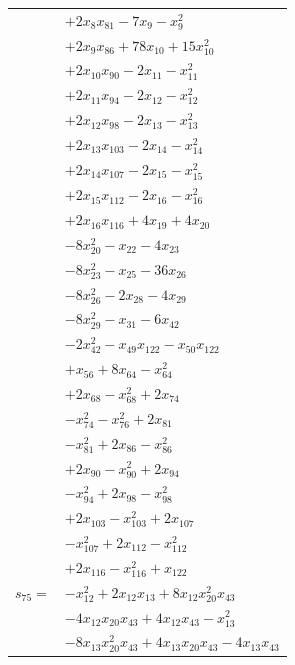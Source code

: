 \begin{longtable}{@{}r@{\;}l@{}}
 & \(\displaystyle +2x_{8}x_{81} -7x_{9} -x_{9}^{2}\) \\
 & \(\displaystyle +2x_{9}x_{86} +78x_{10} +15x_{10}^{2}\) \\
 & \(\displaystyle +2x_{10}x_{90} -2x_{11} -x_{11}^{2}\) \\
 & \(\displaystyle +2x_{11}x_{94} -2x_{12} -x_{12}^{2}\) \\
 & \(\displaystyle +2x_{12}x_{98} -2x_{13} -x_{13}^{2}\) \\
 & \(\displaystyle +2x_{13}x_{103} -2x_{14} -x_{14}^{2}\) \\
 & \(\displaystyle +2x_{14}x_{107} -2x_{15} -x_{15}^{2}\) \\
 & \(\displaystyle +2x_{15}x_{112} -2x_{16} -x_{16}^{2}\) \\
 & \(\displaystyle +2x_{16}x_{116} +4x_{19} +4x_{20}\) \\
 & \(\displaystyle -8x_{20}^{2} -x_{22} -4x_{23}\) \\
 & \(\displaystyle -8x_{23}^{2} -x_{25} -36x_{26}\) \\
 & \(\displaystyle -8x_{26}^{2} -2x_{28} -4x_{29}\) \\
 & \(\displaystyle -8x_{29}^{2} -x_{31} -6x_{42}\) \\
 & \(\displaystyle -2x_{42}^{2} -x_{49}x_{122} -x_{50}x_{122}\) \\
 & \(\displaystyle +x_{56} +8x_{64} -x_{64}^{2}\) \\
 & \(\displaystyle +2x_{68} -x_{68}^{2} +2x_{74}\) \\
 & \(\displaystyle -x_{74}^{2} -x_{76}^{2} +2x_{81}\) \\
 & \(\displaystyle -x_{81}^{2} +2x_{86} -x_{86}^{2}\) \\
 & \(\displaystyle +2x_{90} -x_{90}^{2} +2x_{94}\) \\
 & \(\displaystyle -x_{94}^{2} +2x_{98} -x_{98}^{2}\) \\
 & \(\displaystyle +2x_{103} -x_{103}^{2} +2x_{107}\) \\
 & \(\displaystyle -x_{107}^{2} +2x_{112} -x_{112}^{2}\) \\
 & \(\displaystyle +2x_{116} -x_{116}^{2} +x_{122}\) \\[3pt]
\(s_{75}=\) & \(\displaystyle -x_{12}^{2} +2x_{12}x_{13} +8x_{12}x_{20}^{2}x_{43}\) \\
 & \(\displaystyle -4x_{12}x_{20}x_{43} +4x_{12}x_{43} -x_{13}^{2}\) \\
 & \(\displaystyle -8x_{13}x_{20}^{2}x_{43} +4x_{13}x_{20}x_{43} -4x_{13}x_{43}\) \\

\end{longtable}
